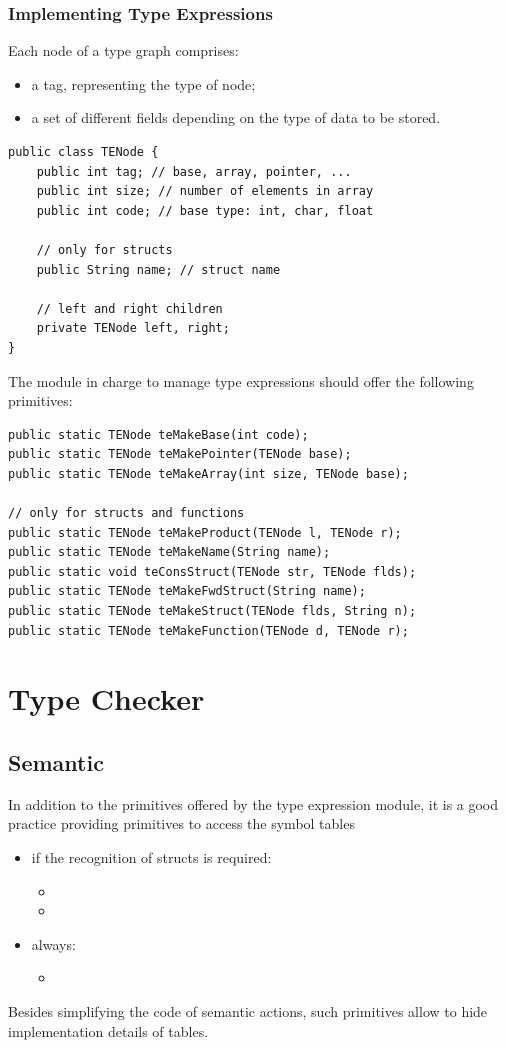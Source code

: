 \subsubsection{Implementing Type Expressions}
Each node of a type graph comprises:
\begin{itemize}
    \item
    a tag, representing the type of node;
    \item
    a set of different fields depending on the type of data to be stored.
\end{itemize}

\begin{lstlisting}[frame=single]
public class TENode {
    public int tag; // base, array, pointer, ...
    public int size; // number of elements in array
    public int code; // base type: int, char, float

    // only for structs
    public String name; // struct name

    // left and right children
    private TENode left, right;
}
\end{lstlisting}
The module in charge to manage type expressions should offer the following primitives:
\begin{lstlisting}
public static TENode teMakeBase(int code);
public static TENode teMakePointer(TENode base);
public static TENode teMakeArray(int size, TENode base);

// only for structs and functions
public static TENode teMakeProduct(TENode l, TENode r);
public static TENode teMakeName(String name);
public static void teConsStruct(TENode str, TENode flds);
public static TENode teMakeFwdStruct(String name);
public static TENode teMakeStruct(TENode flds, String n);
public static TENode teMakeFunction(TENode d, TENode r);
\end{lstlisting}

\section{Type Checker}
\subsection{Semantic}
In addition to the primitives offered by the type expression module, it is a good practice providing primitives to access the symbol tables
\begin{itemize}
    \item
    if the recognition of structs is required:
    \begin{itemize}
        \item
        \item
    \end{itemize}
    \item
    always:
    \begin{itemize}
        \item
    \end{itemize}
\end{itemize}
Besides simplifying the code of semantic actions, such primitives allow to hide implementation details of tables.

